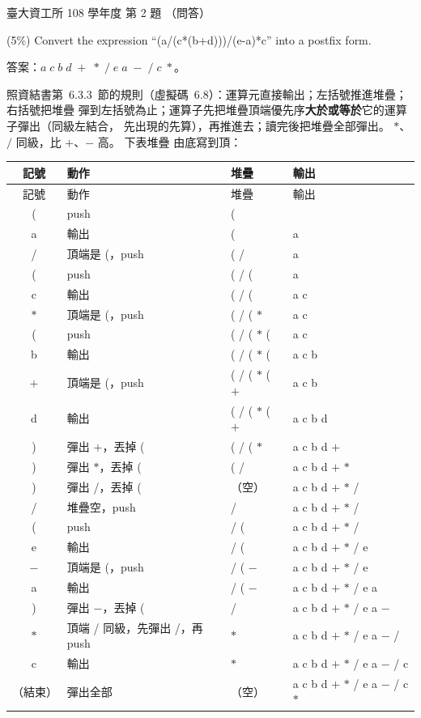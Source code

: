 \begin{pastexam}[label={px:ntu-108-dsaa-02}]{臺大資工所 108 學年度 第 2 題}
（問答）

(5\%) Convert the expression ``(a/(c*(b+d)))/(e-a)*c'' into a postfix form.
\end{pastexam}

\begin{pastsoln}
答案：$a\;c\;b\;d\;+\;*\;/\;e\;a\;-\;/\;c\;*$。

照資結書第~6.3.3~節的規則（虛擬碼~6.8）：運算元直接輸出；左括號推進堆疊；右括號把堆疊
彈到左括號為止；運算子先把堆疊頂端優先序\textbf{大於或等於}它的運算子彈出（同級左結合，
先出現的先算），再推進去；讀完後把堆疊全部彈出。 $*$、$/$ 同級，比 $+$、$-$ 高。 下表堆疊
由底寫到頂：
{\small
\begin{longtable}{clll}
\toprule
記號 & 動作 & 堆疊 & 輸出 \\
\midrule
\endfirsthead
\toprule
記號 & 動作 & 堆疊 & 輸出 \\
\midrule
\endhead
( & push & ( & \\
a & 輸出 & ( & a \\
/ & 頂端是 (，push & ( / & a \\
( & push & ( / ( & a \\
c & 輸出 & ( / ( & a c \\
$*$ & 頂端是 (，push & ( / ( $*$ & a c \\
( & push & ( / ( $*$ ( & a c \\
b & 輸出 & ( / ( $*$ ( & a c b \\
$+$ & 頂端是 (，push & ( / ( $*$ ( $+$ & a c b \\
d & 輸出 & ( / ( $*$ ( $+$ & a c b d \\
) & 彈出 $+$，丟掉 ( & ( / ( $*$ & a c b d $+$ \\
) & 彈出 $*$，丟掉 ( & ( / & a c b d $+$ $*$ \\
) & 彈出 /，丟掉 ( & （空） & a c b d $+$ $*$ / \\
/ & 堆疊空，push & / & a c b d $+$ $*$ / \\
( & push & / ( & a c b d $+$ $*$ / \\
e & 輸出 & / ( & a c b d $+$ $*$ / e \\
$-$ & 頂端是 (，push & / ( $-$ & a c b d $+$ $*$ / e \\
a & 輸出 & / ( $-$ & a c b d $+$ $*$ / e a \\
) & 彈出 $-$，丟掉 ( & / & a c b d $+$ $*$ / e a $-$ \\
$*$ & 頂端 / 同級，先彈出 /，再 push & $*$ & a c b d $+$ $*$ / e a $-$ / \\
c & 輸出 & $*$ & a c b d $+$ $*$ / e a $-$ / c \\
（結束） & 彈出全部 & （空） & a c b d $+$ $*$ / e a $-$ / c $*$ \\
\bottomrule
\end{longtable}
}


\end{pastsoln}
